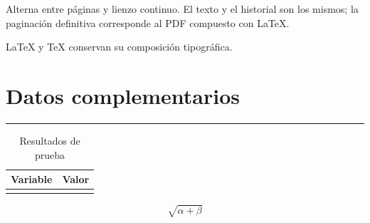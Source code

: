 \documentclass[12pt,a4paper,oneside,openany]{report}
\begin{document}
Alterna entre páginas y lienzo continuo. El texto y el historial son los mismos; la paginación definitiva corresponde al PDF compuesto con \LaTeX{}.

\LaTeX{} y \TeX{} conservan su composición tipográfica.

\appendix
\chapter{Datos complementarios}\label{bAE962C1E-0583-49F5-9223-F5BDD8A22F1B}

\par\medskip\noindent\rule{\linewidth}{0.4pt}\par\medskip

\begin{table}[htbp]\centering\caption{Resultados de prueba}\label{n934B5C86-EDB2-4982-9469-44C9F1D58096}
\begin{tabularx}{\linewidth}{|>{\raggedright\arraybackslash}X|>{\raggedright\arraybackslash}X|}\hline
\textbf{Variable} & \textbf{Valor} \\ \hline
 &  \\ \hline
\end{tabularx}\par{\small }\end{table}

\begin{equation}\sqrt{\alpha  + \beta }\label{nDDEAD693-A9D2-47CB-AD98-025BB285254B}\end{equation}
\end{document}
